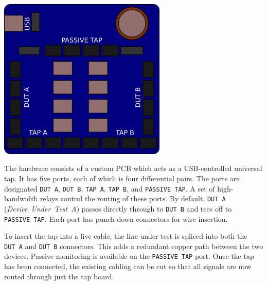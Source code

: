 \documentclass[12pt,notitlepage]{article}
\begin{document}
\newcommand{\textport}[1]{\texttt{#1}}

\begin{center}
    \includegraphics[width=0.6\textwidth]{detour_board}
\end{center}

The hardware consists of a custom PCB which acts as a USB-controlled universal tap. It has five ports, each of which is four differential pairs. The ports are designated \textport{DUT~A}, \textport{DUT~B}, \textport{TAP~A}, \textport{TAP~B}, and \textport{PASSIVE~TAP}. A set of high-bandwidth relays control the routing of these ports. By default, \textport{DUT~A} (\textit{Device~Under~Test~A}) passes directly through to \textport{DUT~B} and tees off to \textport{PASSIVE~TAP}.  Each port has punch-down connectors for wire insertion.

To insert the tap into a live cable, the line under test is spliced into both the \textport{DUT~A} and \textport{DUT~B} connectors. This adds a redundant copper path between the two devices. Passive monitoring is available on the \textport{PASSIVE TAP} port. Once the tap has been connected, the existing cabling can be cut so that all signals are now routed through just the tap board.
\end{document}
